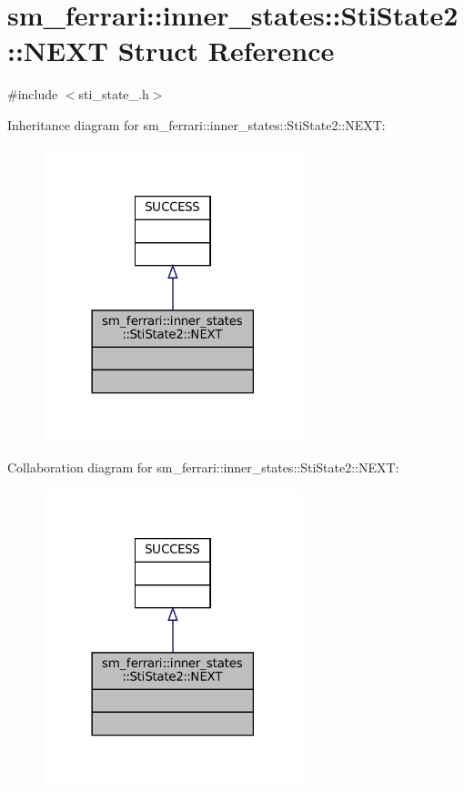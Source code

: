 \hypertarget{structsm__ferrari_1_1inner__states_1_1StiState2_1_1NEXT}{}\section{sm\+\_\+ferrari\+:\+:inner\+\_\+states\+:\+:Sti\+State2\+:\+:N\+E\+XT Struct Reference}
\label{structsm__ferrari_1_1inner__states_1_1StiState2_1_1NEXT}


{\ttfamily \#include $<$sti\+\_\+state\+\_.\+h$>$}



Inheritance diagram for sm\+\_\+ferrari\+:\+:inner\+\_\+states\+:\+:Sti\+State2\+:\+:N\+E\+XT\+:
\nopagebreak
\begin{figure}[H]
\begin{center}
\leavevmode
\includegraphics[width=213pt]{structsm__ferrari_1_1inner__states_1_1StiState2_1_1NEXT__inherit__graph}
\end{center}
\end{figure}


Collaboration diagram for sm\+\_\+ferrari\+:\+:inner\+\_\+states\+:\+:Sti\+State2\+:\+:N\+E\+XT\+:
\nopagebreak
\begin{figure}[H]
\begin{center}
\leavevmode
\includegraphics[width=213pt]{structsm__ferrari_1_1inner__states_1_1StiState2_1_1NEXT__coll__graph}
\end{center}
\end{figure}


